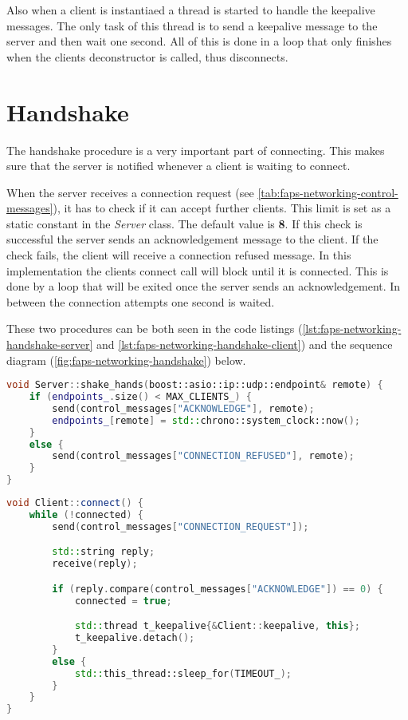 Also when a client is instantiaed a thread is started to handle the keepalive messages. The only task of this thread is to send a keepalive message to the server and then wait one second. All of this is done in a loop that
only finishes when the clients deconstructor is called, thus disconnects.

\section {Handshake}

The handshake procedure is a very important part of connecting. This makes sure that the server is notified whenever a client is waiting to connect.

When the server receives a connection request (see \ref{tab:faps-networking-control-messages}), it has to check if it can accept further clients. This limit is set as a static constant in the \textit{Server} class. The
default value is \textbf{8}. If this check is successful the server sends an acknowledgement message to the client. If the check fails, the client will receive a connection refused message. In this implementation the
clients connect call will block until it is connected. This is done by a loop that will be exited once the server sends an acknowledgement. In between the connection attempts one second is waited.

These two procedures can be both seen in the code listings (\ref{lst:faps-networking-handshake-server} and \ref{lst:faps-networking-handshake-client}) and the sequence diagram (\ref{fig:faps-networking-handshake}) below.

\begin{minipage}{\linewidth}
\begin{lstlisting}[caption={Server handshake method}, label=lst:faps-networking-handshake-server, captionpos=b, language=C++]
void Server::shake_hands(boost::asio::ip::udp::endpoint& remote) {
    if (endpoints_.size() < MAX_CLIENTS_) {
        send(control_messages["ACKNOWLEDGE"], remote);
        endpoints_[remote] = std::chrono::system_clock::now();
    }
    else {
        send(control_messages["CONNECTION_REFUSED"], remote);
    }
}
\end{lstlisting}
\end{minipage}

\begin{minipage}{\linewidth}
\begin{lstlisting}[caption={Client handshake method}, label=lst:faps-networking-handshake-client, captionpos=b, language=C++]
void Client::connect() {
    while (!connected) {
        send(control_messages["CONNECTION_REQUEST"]);

        std::string reply;
        receive(reply);

        if (reply.compare(control_messages["ACKNOWLEDGE"]) == 0) {
            connected = true;

            std::thread t_keepalive{&Client::keepalive, this};
            t_keepalive.detach();
        }
        else {
            std::this_thread::sleep_for(TIMEOUT_);
        }
    }
}
\end{lstlisting}
\end{minipage}

